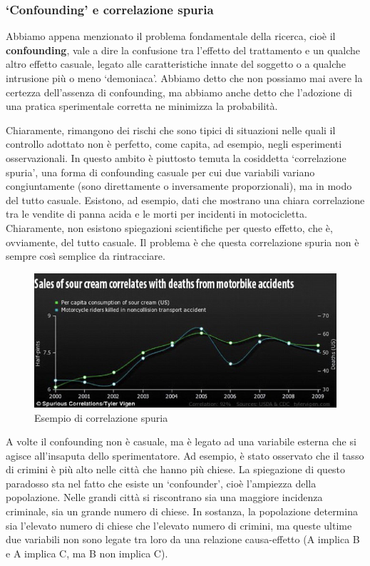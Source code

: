 \documentclass[a4paper,12pt,oneside]{book}
\begin{document}
\hypertarget{confounding-e-correlazione-spuria}{%
\subsubsection{`Confounding' e correlazione spuria}\label{confounding-e-correlazione-spuria}}

Abbiamo appena menzionato il problema fondamentale della ricerca, cioè il \textbf{confounding}, vale a dire la confusione tra l'effetto del trattamento e un qualche altro effetto casuale, legato alle caratteristiche innate del soggetto o a qualche intrusione più o meno `demoniaca'. Abbiamo detto che non possiamo mai avere la certezza dell'assenza di confounding, ma abbiamo anche detto che l'adozione di una pratica sperimentale corretta ne minimizza la probabilità.

Chiaramente, rimangono dei rischi che sono tipici di situazioni nelle quali il controllo adottato non è perfetto, come capita, ad esempio, negli esperimenti osservazionali. In questo ambito è piuttosto temuta la cosiddetta `correlazione spuria', una forma di confounding casuale per cui due variabili variano congiuntamente (sono direttamente o inversamente proporzionali), ma in modo del tutto casuale. Esistono, ad esempio, dati che mostrano una chiara correlazione tra le vendite di panna acida e le morti per incidenti in motocicletta. Chiaramente, non esistono spiegazioni scientifiche per questo effetto, che è, ovviamente, del tutto casuale. Il problema è che questa correlazione spuria non è sempre così semplice da rintracciare.

\begin{figure}

{\centering \includegraphics[width=0.9\linewidth]{_images/PannaAcida} 

}

\caption{Esempio di correlazione spuria}\label{fig:figName22}
\end{figure}

A volte il confounding non è casuale, ma è legato ad una variabile esterna che si agisce all'insaputa dello sperimentatore. Ad esempio, è stato osservato che il tasso di crimini è più alto nelle città che hanno più chiese. La spiegazione di questo paradosso sta nel fatto che esiste un `confounder', cioè l'ampiezza della popolazione. Nelle grandi città si riscontrano sia una maggiore incidenza criminale, sia un grande numero di chiese. In sostanza, la popolazione determina sia l'elevato numero di chiese che l'elevato numero di crimini, ma queste ultime due variabili non sono legate tra loro da una relazione causa-effetto (A implica B e A implica C, ma B non implica C).
\end{document}
